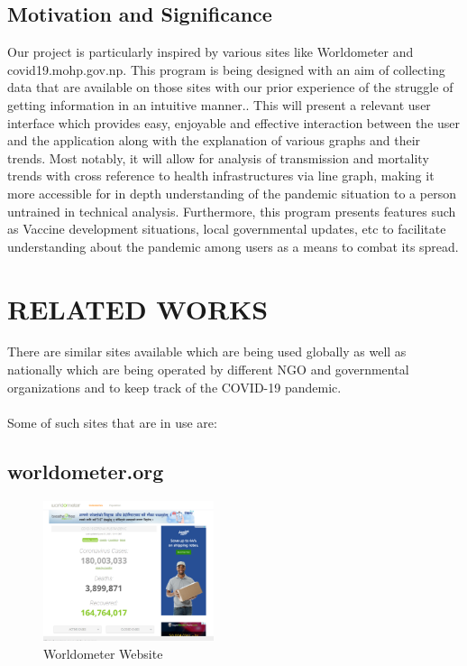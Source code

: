\documentclass{article}
\begin{document}
\vspace*{5mm}
\subsection{Motivation and Significance}
Our project is particularly inspired by various sites like Worldometer and covid19.mohp.gov.np. This program is being designed with an aim of collecting data that 
are available on those sites with our prior experience of the struggle of getting information in an intuitive manner.. This will present a relevant user interface 
which provides easy, enjoyable and effective interaction between the user and the application along with the explanation of various graphs and their trends. Most 
notably, it will allow for analysis of transmission and mortality trends with cross reference to health infrastructures via line graph, making it more accessible 
for in depth understanding of the pandemic situation to a person untrained in technical analysis. Furthermore, this program presents features such as Vaccine 
development situations, local governmental updates, etc to facilitate understanding about the pandemic among users as a means to combat its spread.

\clearpage

\section{RELATED WORKS}
There are similar sites available which are being used globally as well as nationally which are being operated by different NGO and governmental organizations and 
to keep track of the COVID-19 pandemic.
\\\\
Some of such sites that are in use are:

\subsection{worldometer.org}
\begin{figure}[h]
    \centerline{\includegraphics[width = 50mm]{worldometer.png}}
    \caption{Worldometer Website}
    \label{fig}
\end{figure}
\end{document}
